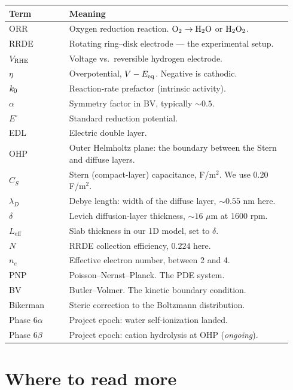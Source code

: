 \documentclass[11pt]{article}
\begin{document}
\begin{center}
\begin{tabular}{p{0.20\linewidth} p{0.74\linewidth}}
\toprule
\textbf{Term} & \textbf{Meaning} \\
\midrule
ORR     & Oxygen reduction reaction. $\mathrm{O_2} \to \mathrm{H_2O}$ or $\mathrm{H_2O_2}$. \\
RRDE    & Rotating ring--disk electrode --- the experimental setup. \\
$V_{\mathrm{RHE}}$ & Voltage vs.\ reversible hydrogen electrode. \\
$\eta$  & Overpotential, $V - E_{\mathrm{eq}}$. Negative is cathodic. \\
$k_0$ & Reaction-rate prefactor (intrinsic activity). \\
$\alpha$ & Symmetry factor in BV, typically $\sim 0.5$. \\
$E^{\circ}$ & Standard reduction potential. \\
EDL     & Electric double layer. \\
OHP     & Outer Helmholtz plane: the boundary between the Stern and diffuse layers. \\
$C_S$   & Stern (compact-layer) capacitance, F/m$^2$. We use 0.20 F/m$^2$. \\
$\lambda_D$ & Debye length: width of the diffuse layer, $\sim 0.55$ nm here. \\
$\delta$    & Levich diffusion-layer thickness, $\sim 16$ $\mu$m at 1600 rpm. \\
$L_{\mathrm{eff}}$ & Slab thickness in our 1D model, set to $\delta$. \\
$N$         & RRDE collection efficiency, $0.224$ here. \\
$n_e$       & Effective electron number, between 2 and 4. \\
PNP    & Poisson--Nernst--Planck. The PDE system. \\
BV     & Butler--Volmer. The kinetic boundary condition. \\
Bikerman & Steric correction to the Boltzmann distribution. \\
Phase 6$\alpha$ & Project epoch: water self-ionization landed. \\
Phase 6$\beta$  & Project epoch: cation hydrolysis at OHP (\textit{ongoing}). \\
\bottomrule
\end{tabular}
\end{center}

\section{Where to read more}
\end{document}
